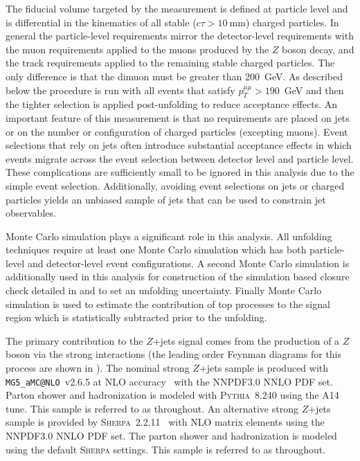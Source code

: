 The fiducial volume targeted by the measurement is defined at particle level and is differential in the kinematics of all stable ($c\tau > 10~\mathrm{mm}$) charged particles.
In general the particle-level requirements mirror the detector-level requirements with the muon requirements applied to the muons produced by the $Z$ boson decay, and the track requirements applied to the remaining stable charged particles.
The only difference is that the dimuon \pt must be greater than 200~GeV.
As described below the \Omnifold procedure is run with all events that satisfy $p_T^{\mu\mu} > 190$~GeV and then the tighter selection is applied post-unfolding to reduce acceptance effects.
An important feature of this measurement is that no requirements are placed on jets or on the number or configuration of charged particles (excepting muons).
Event selections that rely on jets often introduce substantial acceptance effects in which events migrate across the event selection between detector level and particle level.
These complications are sufficiently small to be ignored in this analysis due to the simple event selection.
Additionally, avoiding event selections on jets or charged particles yields an unbiased sample of jets that can be used to constrain jet observables.

Monte Carlo simulation plays a significant role in this analysis.
All unfolding techniques require at least one Monte Carlo simulation which has both particle-level and detector-level event configurations.
A second Monte Carlo simulation is additionally used in this analysis for construction of the simulation based closure check detailed in  and to set an unfolding uncertainty.
Finally Monte Carlo simulation is used to estimate the contribution of top processes to the signal region which is statistically subtracted prior to the unfolding.

The primary contribution to the $Z$+jets signal comes from the production of a $Z$ boson via the strong interactions (the leading order Feynman diagrams for this process are shown in ).
The nominal strong $Z$+jets sample is produced with \texttt{MG5\_aMC@NLO}~v2.6.5 at NLO accuracy~\cite{Alwall:2014hca,Frederix:2012ps} with the NNPDF3.0 NNLO PDF set.
Parton shower and hadronization is modeled with \textsc{Pythia}~8.240 using the A14 tune.
This sample is referred to as \mgpy throughout.
An alternative strong $Z$+jets sample is provided by \textsc{Sherpa}~2.2.11~\cite{Bothmann:2019yzt} with NLO matrix elements using the NNPDF3.0 NNLO PDF set.
The parton shower and hadronization is modeled using the default \textsc{Sherpa} settings.
This sample is referred to as \sherpa throughout.

